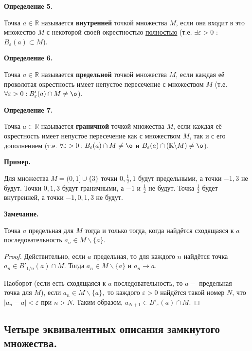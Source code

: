 \documentclass[12pt]{article}
\theoremstyle{definition}
\begin{document}
\textbf{Определение 5.}

Точка $a\in\mathbb{R}$ называется \textbf{внутренней} точкой множества $M$, если она входит в это множество $M$ с некоторой своей окрестностью \underline{полностью} (т.е. $\exists\varepsilon > 0$ : $B_\varepsilon(a)\subset M$).

\textbf{Определение 6.}

Точка $a\in\mathbb{R}$ называется \textbf{предельной} точкой множества $M$, если каждая её проколотая окрестность имеет непустое пересечение с множеством $M$ (т.е. $\forall\varepsilon > 0: B'_\varepsilon(a)\cap M\neq \o$).

\textbf{Определение 7.}

Точка $a\in\mathbb{R}$ называется \textbf{граничной} точкой множества $M$, если каждая её окрестность имеет непустое пересечение как с множеством $M$, так и с его дополнением (т.е. $\forall\varepsilon > 0: B_\varepsilon(a)\cap M\neq \o$ и $B_\varepsilon(a)\cap(\mathbb{R}\backslash M)\neq\o$).

\textbf{Пример.}

Для множества $M = (0, 1]\cup\{3\}$ точки $0, \frac{1}{2}, 1$ будут предельными, а точки $-1, 3$ не будут. Точки $0, 1, 3$ будут граничными, а $-1$ и $\frac{1}{2}$ не будут. Точка $\frac{1}{2}$ будет внутренней, а точки $-1, 0, 1, 3$ не будут.

\textbf{Замечание.}

Точка $a$ предельная для $M$ тогда и только тогда, когда найдётся сходящаяся к $a$ последовательность $a_n \in M\backslash\{a\}$. 

\begin{proof}
Действительно, если $a$ предельная, то для каждого $n$ найдётся точка \newline$a_n\in B'_{1/n}(a)\cap M$. Тогда $a_n\in M\backslash\{a\}$ и $a_n\rightarrow a.$ 

Наоборот (если есть сходящаяся к $a$ последовательность, то $a - $ предельная точка для $M$), если $a_n\in M\backslash\{a\},$ то каждого $\varepsilon>0$ найдётся такой номер $N$, что $|a_n - a|<\varepsilon$ при $n>N$. Таким образом, $a_{N+1}\in B'_\varepsilon(a)\cap M$.
\end{proof}

\newpage

\subsection{Четыре эквивалентных описания замкнутого множества.}
\end{document}
